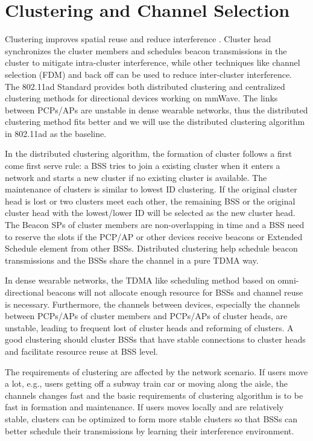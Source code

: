 \documentclass[10pt, conference, letterpaper]{IEEEtran}
\begin{document}
\newpage


\section{Clustering and Channel Selection}
Clustering improves spatial reuse and reduce interference \cite{80211ad}. Cluster head synchronizes the cluster members and schedules beacon transmissions in the cluster to mitigate intra-cluster interference, while other techniques like channel selection (FDM) and back off \cite{backoff} can be used to reduce inter-cluster interference. The 802.11ad Standard provides both distributed clustering and centralized clustering methods for directional devices working on mmWave. The links between PCPs/APs are unstable in dense wearable networks, thus the distributed clustering method fits better and we will use the distributed clustering algorithm in 802.11ad as the baseline.

In the distributed clustering algorithm, the formation of cluster follows a first come first serve rule: a BSS tries to join a existing cluster when it enters a network and starts a new cluster if no existing cluster is available. The maintenance of clusters is similar to lowest ID clustering. If the original cluster head is lost or two clusters meet each other, the remaining BSS or the original cluster head with the lowest/lower ID will be selected as the new cluster head. The Beacon SPs of cluster members are non-overlapping in time and a BSS need to reserve the slots if the PCP/AP or other devices receive beacons or Extended Schedule element from other BSSs. Distributed clustering help schedule beacon transmissions and the BSSs share the channel in a pure TDMA way. 

In dense wearable networks, the TDMA like scheduling method based on omni-directional beacons will not allocate enough resource for BSSs and channel reuse is necessary. Furthermore, the channels between devices, especially the channels between PCPs/APs of cluster members and PCPs/APs of cluster heads, are unstable, leading to frequent lost of cluster heads and reforming of clusters. A good clustering should cluster BSSs that have stable connections to cluster heads and facilitate resource reuse at BSS level.

The requirements of clustering are affected by the network scenario. If users move a lot, e.g., users getting off a subway train car or moving along the aisle, the channels changes fast and the basic requirements of clustering algorithm is to be fast in formation and maintenance. If users moves locally and are relatively stable, clusters can be optimized to form more stable clusters so that BSSs can better schedule their transmissions by learning their interference environment. 
\end{document}
